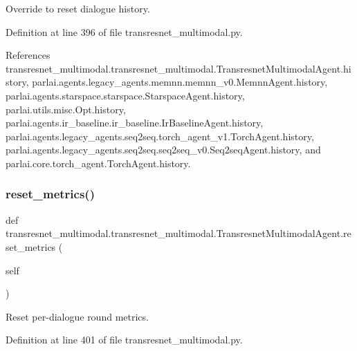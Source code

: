 \begin{DoxyVerb}Override to reset dialogue history.\end{DoxyVerb}
 

Definition at line 396 of file transresnet\+\_\+multimodal.\+py.



References transresnet\+\_\+multimodal.\+transresnet\+\_\+multimodal.\+Transresnet\+Multimodal\+Agent.\+history, parlai.\+agents.\+legacy\+\_\+agents.\+memnn.\+memnn\+\_\+v0.\+Memnn\+Agent.\+history, parlai.\+agents.\+starspace.\+starspace.\+Starspace\+Agent.\+history, parlai.\+utils.\+misc.\+Opt.\+history, parlai.\+agents.\+ir\+\_\+baseline.\+ir\+\_\+baseline.\+Ir\+Baseline\+Agent.\+history, parlai.\+agents.\+legacy\+\_\+agents.\+seq2seq.\+torch\+\_\+agent\+\_\+v1.\+Torch\+Agent.\+history, parlai.\+agents.\+legacy\+\_\+agents.\+seq2seq.\+seq2seq\+\_\+v0.\+Seq2seq\+Agent.\+history, and parlai.\+core.\+torch\+\_\+agent.\+Torch\+Agent.\+history.

\mbox{\label{classtransresnet__multimodal_1_1transresnet__multimodal_1_1TransresnetMultimodalAgent_a4c4ac71e3a1844f6576f66f64896153f}} 
\subsubsection{\texorpdfstring{reset\+\_\+metrics()}{reset\_metrics()}}
{\footnotesize\ttfamily def transresnet\+\_\+multimodal.\+transresnet\+\_\+multimodal.\+Transresnet\+Multimodal\+Agent.\+reset\+\_\+metrics (\begin{DoxyParamCaption}\item[{}]{self }\end{DoxyParamCaption})}

\begin{DoxyVerb}Reset per-dialogue round metrics.\end{DoxyVerb}
 

Definition at line 401 of file transresnet\+\_\+multimodal.\+py.



